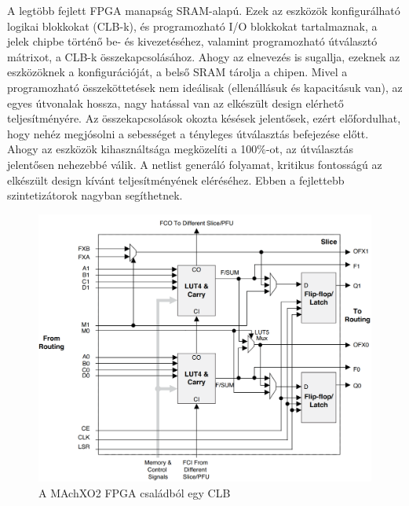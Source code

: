 \documentclass[a4paper,12pt,oneside]{book}
\begin{document}
A legtöbb fejlett FPGA manapság SRAM-alapú. Ezek az eszközök konfigurálható logikai blokkokat (CLB-k), és programozható I/O blokkokat tartalmaznak, a jelek chipbe történő be- és kivezetéséhez, valamint programozható útválasztó mátrixot, a CLB-k összekapcsolásához. Ahogy az elnevezés is sugallja, ezeknek az eszközöknek a konfigurációját, a belső SRAM tárolja a chipen. Mivel a programozható összeköttetések nem ideálisak (ellenállásuk és kapacitásuk van), az egyes útvonalak hossza, nagy hatással van az elkészült design elérhető teljesítményére. Az összekapcsolások okozta késések jelentősek, ezért előfordulhat, hogy nehéz megjósolni a sebességet a tényleges útválasztás befejezése előtt. Ahogy az eszközök kihasználtsága megközelíti a 100\%-ot, az útválasztás jelentősen nehezebbé válik. A netlist generáló folyamat, kritikus fontosságú az elkészült design kívánt teljesítményének eléréséhez. Ebben a fejlettebb szintetizátorok nagyban segíthetnek. 

\begin{figure}[H]
	\centering
	\includegraphics[trim=1mm 1mm 1mm 1mm,scale=0.38]{logickblockfromx02.png}
	\caption{A MAchXO2 FPGA családból egy CLB}
	\label{CLB}
\end{figure}
\end{document}
